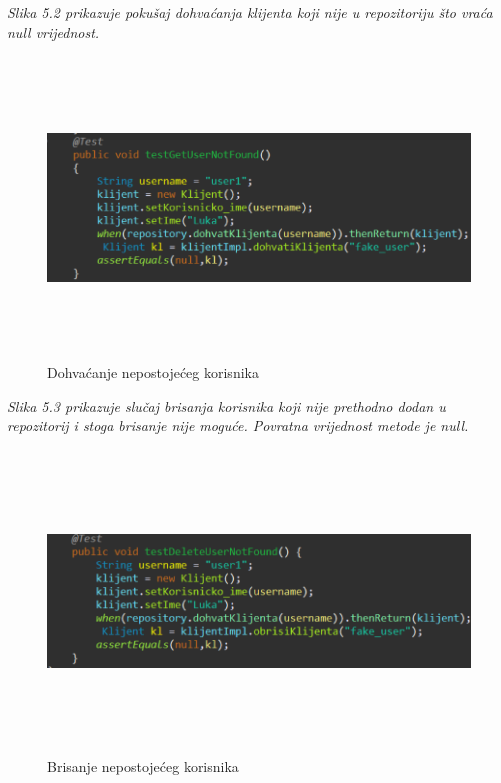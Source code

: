 		
		\newpage
		
		\textit{
			Slika 5.2 prikazuje pokušaj dohvaćanja klijenta koji nije u repozitoriju što vraća null vrijednost. }
		\begin{figure}[H]
			\centering
			\includegraphics[width=\textwidth,height=8cm]{slike/slike_testova/JUNIT/test2.PNG}
			\caption{Dohvaćanje nepostojećeg korisnika}
			\label{fig:my_label}
		\end{figure}
	
	\textit{
		Slika 5.3 prikazuje slučaj brisanja korisnika koji nije prethodno dodan u repozitorij i stoga brisanje nije moguće. Povratna vrijednost metode je null. }
	\begin{figure}[H]
		\centering
		\includegraphics[width=\textwidth,height=8cm]{slike/slike_testova/JUNIT/test3.PNG}
		\caption{Brisanje nepostojećeg korisnika}
		\label{fig:my_label}
	\end{figure}
			
